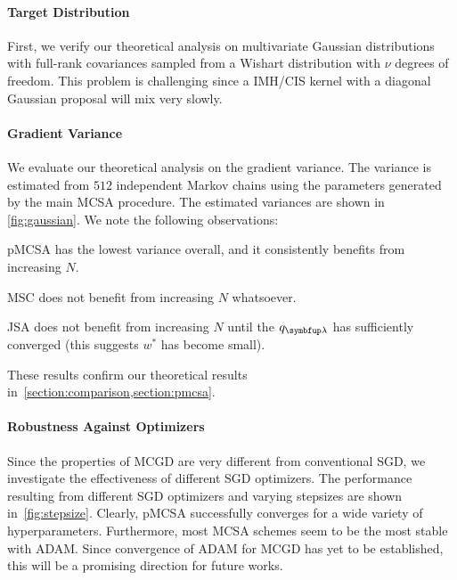 \paragraph{Target Distribution}
First, we verify our theoretical analysis on multivariate Gaussian distributions with full-rank covariances sampled from a Wishart distribution with  \(\nu\) degrees of freedom.
This problem is challenging since a IMH/CIS kernel with a diagonal Gaussian proposal will mix very slowly.

\vspace{-0.1in}
\paragraph{Gradient Variance}
We evaluate our theoretical analysis on the gradient variance.
The variance is estimated from \(512\) independent Markov chains using the parameters generated by the main MCSA procedure.
The estimated variances are shown in \cref{fig:gaussian}.
We note the following observations:
\begin{enumerate*}[label=\textbf{(\roman*)}]
  \item pMCSA has the lowest variance overall, and it consistently benefits from increasing \(N\).
  \item MSC does not benefit from increasing \(N\) whatsoever.
  \item JSA does not benefit from increasing \(N\) until the \(q_{\vlambda}\) has sufficiently converged (this suggests \(w^*\) has become small).
\end{enumerate*}
These results confirm our theoretical results in~\cref{section:comparison,section:pmcsa}.

\vspace{-0.1in}
\paragraph{Robustness Against Optimizers}
Since the properties of MCGD are very different from conventional SGD, we investigate the effectiveness of different SGD optimizers.
The performance resulting from different SGD optimizers and varying stepsizes are shown in~\cref{fig:stepsize}.
Clearly, pMCSA successfully converges for a wide variety of hyperparameters.
Furthermore, most MCSA schemes seem to be the most stable with ADAM.
Since convergence of ADAM for MCGD has yet to be established, this will be a promising direction for future works.

